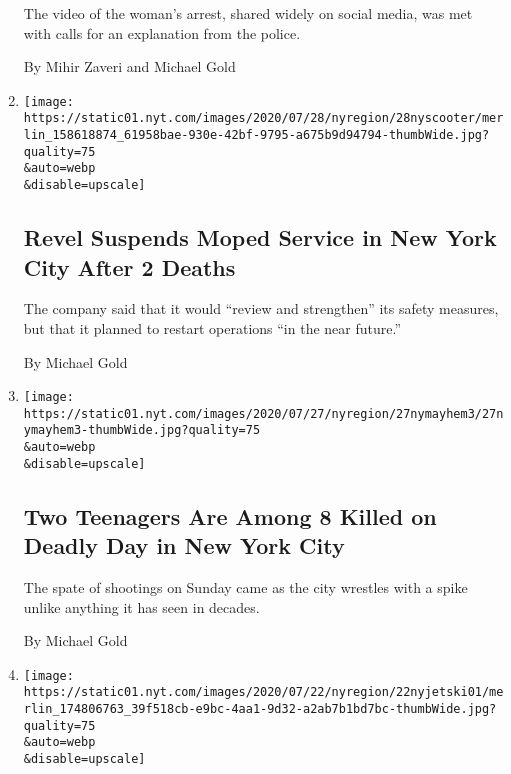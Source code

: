 \begin{enumerate}
  The video of the woman's arrest, shared widely on social media, was
  met with calls for an explanation from the police.

  By Mihir Zaveri and Michael Gold
\item
  \href{/2020/07/28/nyregion/revel-scooters-death-nyc.html}{}

  \texttt{[image: https://static01.nyt.com/images/2020/07/28/nyregion/28nyscooter/merlin\_158618874\_61958bae-930e-42bf-9795-a675b9d94794-thumbWide.jpg?quality=75\\\&auto=webp\\\&disable=upscale]}

  \hypertarget{revel-suspends-moped-service-in-new-york-city-after-2-deaths}{%
  \subsection{Revel Suspends Moped Service in New York City After 2
  Deaths}\label{revel-suspends-moped-service-in-new-york-city-after-2-deaths}}

  The company said that it would ``review and strengthen'' its safety
  measures, but that it planned to restart operations ``in the near
  future.''

  By Michael Gold
\item
  \href{/2020/07/27/nyregion/nyc-shootings-weekend.html}{}

  \texttt{[image: https://static01.nyt.com/images/2020/07/27/nyregion/27nymayhem3/27nymayhem3-thumbWide.jpg?quality=75\\\&auto=webp\\\&disable=upscale]}

  \hypertarget{two-teenagers-are-among-8-killed-on-deadly-day-in-new-york-city}{%
  \subsection{Two Teenagers Are Among 8 Killed on Deadly Day in New York
  City}\label{two-teenagers-are-among-8-killed-on-deadly-day-in-new-york-city}}

  The spate of shootings on Sunday came as the city wrestles with a
  spike unlike anything it has seen in decades.

  By Michael Gold
\item
  \href{/2020/07/21/nyregion/jet-ski-accident-bronx-nyc.html}{}

  \texttt{[image: https://static01.nyt.com/images/2020/07/22/nyregion/22nyjetski01/merlin\_174806763\_39f518cb-e9bc-4aa1-9d32-a2ab7b1bd7bc-thumbWide.jpg?quality=75\\\&auto=webp\\\&disable=upscale]}

  \hypertarget{2-killed-in-jet-ski-crash-as-waters-get-crowded-during-pandemic}{%
}
\end{enumerate}
